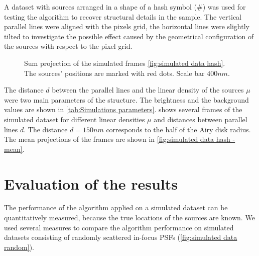 A dataset with sources arranged in a shape of a hash symbol (\#) was used for testing the algorithm to recover structural details in the sample. The vertical parallel lines were aligned with the pixels grid, the horizontal lines were slightly tilted to investigate the possible effect caused by the geometrical configuration of the sources with respect to the pixel grid. 
%
\begin{figure}[!htb]	
	\newcommand{\widthfig}{.3\textwidth}	
	\centering	
	\hspace{.3cm}		
	\hspace{.3cm}	
	\caption{Sum projection of the simulated frames \autoref{fig:simulated data hash}. The sources' positions are marked with red dots. Scale bar $400 \unit{nm}$.}
	\label{fig:simulated data hash - mean}
\end{figure} 
%
The distance $d$ between the parallel lines and the linear density of the sources $\mu$ were two main parameters of the structure. The brightness and the background values are shown in \autoref{tab:Simulations parameters}.  shows several frames of the simulated dataset for different linear densities $\mu$ and distances between parallel lines $d$. The distance $d=150\unit{nm}$ corresponds to the half of the Airy disk radius. The mean projections of the frames are shown in \autoref{fig:simulated data hash - mean}.  


\clearpage
\section{Evaluation of the results\label{sec:evaluation}}

The performance of the algorithm applied on a simulated dataset can be quantitatively measured, because the true locations of the sources are known. We used several measures to compare the algorithm performance on simulated datasets consisting of randomly scattered in-focus PSFs (\autoref{fig:simulated data random}). 

